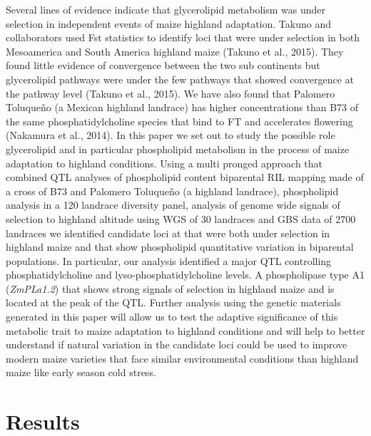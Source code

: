 \documentclass[9pt,twocolumn,twoside,lineno]{gsajnl}
\begin{document}
Several lines of evidence indicate that glycerolipid metabolism was under selection in independent events of maize highland adaptation. 
Takuno and collaborators used Fst statistics to identify loci that were under selection in both Mesoamerica and South America highland maize (Takuno et al., 2015). 
They found little evidence of convergence between the two sub continents but glycerolipid pathways were under the few pathways that showed convergence at the pathway level (Takuno et al., 2015). 
We have also found that Palomero Toluqueño (a Mexican highland landrace) has higher concentrations than B73 of the same phosphatidylcholine species that bind to FT and accelerates flowering (Nakamura et al., 2014).
In this paper we set out to study the possible role glycerolipid and in particular phospholipid metabolism in the process of maize adaptation to highland conditions. 
Using a multi pronged approach that combined QTL analyses of phospholipid content biparental RIL mapping made of a cross of B73 and Palomero Toluqueño (a highland landrace), phospholipid analysis in a 120 landrace diversity panel, analysis of genome wide signals of selection to highland altitude using WGS of 30 landraces and GBS data of 2700 landraces we identified candidate loci at that were both under selection in highland maize and that show phospholipid quantitative variation  in biparental populations. 
In particular, our analysis identified a major QTL controlling phosphatidylcholine and lyso-phosphatidylcholine levels. A phospholipase type A1 (\textit{ZmPLa1.2}) that shows strong signals of selection in highland maize and is located at the peak of the QTL. Further analysis using the genetic materials generated in this paper will allow us to test the adaptive significance of this metabolic trait to maize adaptation to highland conditions and will help to better understand if natural variation in the candidate loci could be used to improve modern maize varieties that face similar environmental conditions than highland maize like early season cold stress. 
\section{Results}
\label{sec:results}
\end{document}
